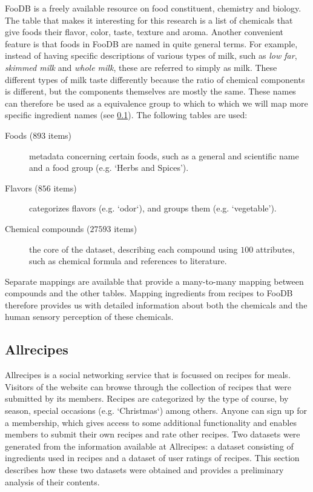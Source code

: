 FooDB is a freely available resource on food constituent, chemistry and biology.
The table that makes it interesting for this research is a list of chemicals that give foods their flavor, color, taste, texture and aroma.
Another convenient feature is that foods in FooDB are named in quite general terms.
For example, instead of having specific descriptions of various types of milk, such as \emph{low far}, \emph{skimmed milk} and \emph{whole milk}, these are referred to simply as milk.
These different types of milk taste differently because the ratio of chemical components is different, but the components themselves are mostly the same.
These names can therefore be used as a equivalence group to which to which we will map more specific ingredient names (see \cref{subsec:allrecipes}).
The following tables are used:

\begin{description}
	\item [Foods ($893$ items)] metadata concerning certain foods, such as a general and scientific name and a food group (e.g. `Herbs and Spices').
	\item [Flavors ($856$ items)] categorizes flavors (e.g. `odor`), and groups them (e.g. `vegetable').
	\item [Chemical compounds ($\num{27593}$ items)] the core of the dataset, describing each compound using $100$ attributes, such as chemical formula and references to literature.
\end{description}

Separate mappings are available that provide a many-to-many mapping between compounds and the other tables.
Mapping ingredients from recipes to FooDB therefore provides us with detailed information about both the chemicals and the human sensory perception of these chemicals.




\subsection{Allrecipes}
\label{subsec:allrecipes}

Allrecipes is a social networking service that is focussed on recipes for meals.
Visitors of the website can browse through the collection of recipes that were submitted by its members.
Recipes are categorized by the type of course, by season, special occasions (e.g. `Christmas`) among others.
Anyone can sign up for a membership, which gives access to some additional functionality and enables members to submit their own recipes and rate other recipes.
Two datasets were generated from the information available at Allrecipes: a dataset consisting of ingredients used in recipes and a dataset of user ratings of recipes.
This section describes how these two datasets were obtained and provides a preliminary analysis of their contents.


